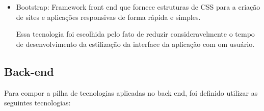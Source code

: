 \documentclass[
    12pt,               %
    openright,          %
    oneside,
    a4paper,            %
    BIBLATEX,           %
    TODO,               %
    english,            %
    brazil              %
    ]{ifsp-spo-inf-ctds}
\begin{document}
\begin{itemize}
            \item Bootstrap:
                Framework front end que fornece estruturas de CSS para a criação de sites e aplicações responsivas de forma rápida e simples.
    
                Essa tecnologia foi escolhida pelo fato de reduzir consideravelmente o tempo de desenvolvimento da estilização da interface da aplicação com om usuário.
        
        \end{itemize}
    
        \subsection{Back-end}
    
            Para compor a pilha de tecnologias aplicadas no back end, foi definido utilizar as seguintes tecnologias:
    
\end{document}
